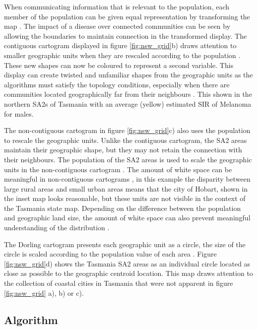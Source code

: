 When communicating information that is relevant to the population, each
member of the population can be given equal representation by
transforming the map \citep{TVSSS}. The impact of a disease over
connected communities can be seen by allowing the boundaries to maintain
connection in the transformed display. The contiguous cartogram
displayed in figure \ref{fig:nsw_grid}b) draws attention to smaller
geographic units when they are rescaled according to the population
\citep{DMAHP}. These new shapes can now be coloured to represent a
second variable. This display can create twisted and unfamiliar shapes
from the geographic units as the algorithms must satisfy the topology
conditions, especially when there are communities located geographically
far from their neighbours \citep{TVSSS}. This shown in the northern SA2s
of Tasmania with an average (yellow) estimated SIR of Melanoma for
males.

The non-contiguous cartogram in figure \ref{fig:nsw_grid}c) also uses
the population to rescale the geographic units. Unlike the contiguous
cartogram, the SA2 areas maintain their geographic shape, but they may
not retain the connection with their neighbours. The population of the
SA2 areas is used to scale the geographic units in the non-contiguous
cartogram \citep{NAC}. The amount of white space can be meaningful in
non-contiguous cartograms \citep{ECGC}, in this example the disparity
between large rural areas and small urban areas means that the city of
Hobart, shown in the inset map looks reasonable, but these units are not
visible in the context of the Tasmania state map. Depending on the
difference between the population and geographic land size, the amount
of white space can also prevent meaningful understanding of the
distribution \citep{TVSSS}.

The Dorling cartogram presents each geographic unit as a circle, the
size of the circle is scaled according to the population value of each
area \citep{ACTUC}. Figure \ref{fig:nsw_grid}d) shows the Tasmania SA2
areas as an individual circle located as close as possible to the
geographic centroid location. This map draws attention to the collection
of coastal cities in Tasmania that were not apparent in figure
\ref{fig:nsw_grid} a), b) or c).

\hypertarget{algorithm}{%
\subsection{Algorithm}\label{algorithm}}

